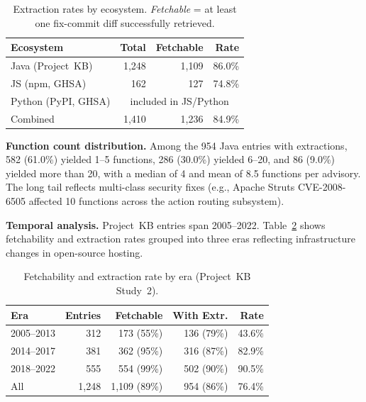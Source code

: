 \documentclass[sigconf,nonacm]{acmart}
\begin{document}
\begin{table}[t]
    \centering
    \caption{Extraction rates by ecosystem. \emph{Fetchable} = at least
    one fix-commit diff successfully retrieved.}
    \label{tab:extraction-rates}
    \begin{tabular}{lrrr}
        \toprule
        \textbf{Ecosystem} & \textbf{Total} & \textbf{Fetchable} & \textbf{Rate} \\
        \midrule
        Java (Project~KB)  & 1{,}248 & 1{,}109 & 86.0\% \\
        JS (npm, GHSA)     &     162 &     127 & 74.8\% \\
        Python (PyPI, GHSA)& \multicolumn{3}{c}{included in JS/Python} \\
        \midrule
        Combined           & 1{,}410 & 1{,}236 & 84.9\% \\
        \bottomrule
    \end{tabular}
\end{table}

\textbf{Function count distribution.}
Among the 954 Java entries with extractions, 582 (61.0\%) yielded
1--5 functions, 286 (30.0\%) yielded 6--20, and 86 (9.0\%) yielded
more than 20, with a median of 4 and mean of 8.5 functions per advisory.
The long tail reflects multi-class security fixes (e.g., Apache Struts
CVE-2008-6505 affected 10 functions across the action routing subsystem).

\textbf{Temporal analysis.}
Project~KB entries span 2005--2022.
Table~\ref{tab:temporal} shows fetchability and extraction rates grouped
into three eras reflecting infrastructure changes in open-source hosting.

\begin{table}[t]
    \centering
    \caption{Fetchability and extraction rate by era (Project~KB Study~2).}
    \label{tab:temporal}
    \begin{tabular}{lrrrr}
        \toprule
        \textbf{Era} & \textbf{Entries} & \textbf{Fetchable} & \textbf{With Extr.} & \textbf{Rate} \\
        \midrule
        2005--2013 & 312 & 173 (55\%) & 136 (79\%) & 43.6\% \\
        2014--2017 & 381 & 362 (95\%) & 316 (87\%) & 82.9\% \\
        2018--2022 & 555 & 554 (99\%) & 502 (90\%) & 90.5\% \\
        \midrule
        All        & 1{,}248 & 1{,}109 (89\%) & 954 (86\%) & 76.4\% \\
        \bottomrule
    \end{tabular}
\end{table}
\end{document}
